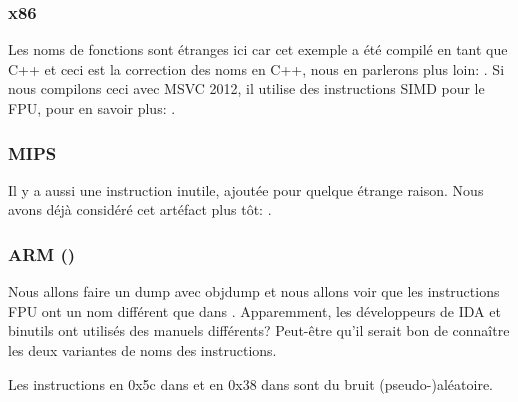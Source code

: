 

\subsubsection{x86}



Les noms de fonctions sont étranges ici car cet exemple a été compilé en tant que
C++ et ceci est la correction des noms en C++, nous en parlerons plus loin: .
Si nous compilons ceci avec MSVC 2012, il utilise des instructions SIMD pour le FPU,
pour en savoir plus: .

\subsubsection{MIPS}



Il y a aussi une instruction  inutile, ajoutée pour quelque étrange raison.
Nous avons déjà considéré cet artéfact plus tôt: .

\subsubsection{ARM (\ARMMode)}




Nous allons faire un dump avec objdump et nous allons voir que les instructions FPU
ont un nom différent que dans \IDA.
Apparemment, les développeurs de IDA et binutils ont utilisés des manuels différents?
Peut-être qu'il serait bon de connaître les deux variantes de noms des instructions.



Les instructions en 0x5c dans  et en 0x38 dans \main sont du bruit
(pseudo-)aléatoire.

